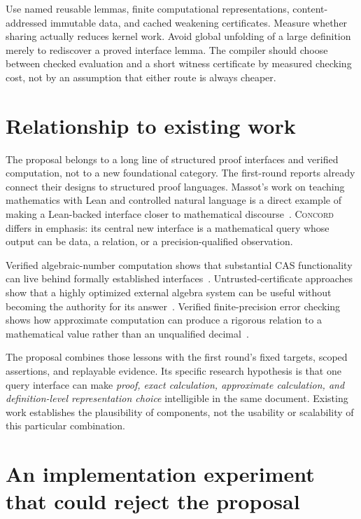 \documentclass[11pt,a4paper]{article}
\newcommand{\Concord}{\textsc{Concord}}
\theoremstyle{definition}
\begin{document}
Use named reusable lemmas, finite computational representations, content-addressed immutable data, and cached weakening certificates. Measure whether sharing actually reduces kernel work. Avoid global unfolding of a large definition merely to rediscover a proved interface lemma. The compiler should choose between checked evaluation and a short witness certificate by measured checking cost, not by an assumption that either route is always cheaper.

\section{Relationship to existing work}\label{sec:prior}

The proposal belongs to a long line of structured proof interfaces and verified computation, not to a new foundational category. The first-round reports already connect their designs to structured proof languages. Massot's work on teaching mathematics with Lean and controlled natural language is a direct example of making a Lean-backed interface closer to mathematical discourse~\cite{massot}. \Concord{} differs in emphasis: its central new interface is a mathematical query whose output can be data, a relation, or a precision-qualified observation.

Verified algebraic-number computation shows that substantial CAS functionality can live behind formally established interfaces~\cite{algnums}. Untrusted-certificate approaches show that a highly optimized external algebra system can be useful without becoming the authority for its answer~\cite{univariate}. Verified finite-precision error checking shows how approximate computation can produce a rigorous relation to a mathematical value rather than an unqualified decimal~\cite{flover}.

The proposal combines those lessons with the first round's fixed targets, scoped assertions, and replayable evidence. Its specific research hypothesis is that one query interface can make \emph{proof, exact calculation, approximate calculation, and definition-level representation choice} intelligible in the same document. Existing work establishes the plausibility of components, not the usability or scalability of this particular combination.

\section{An implementation experiment that could reject the proposal}\label{sec:eval}
\end{document}

